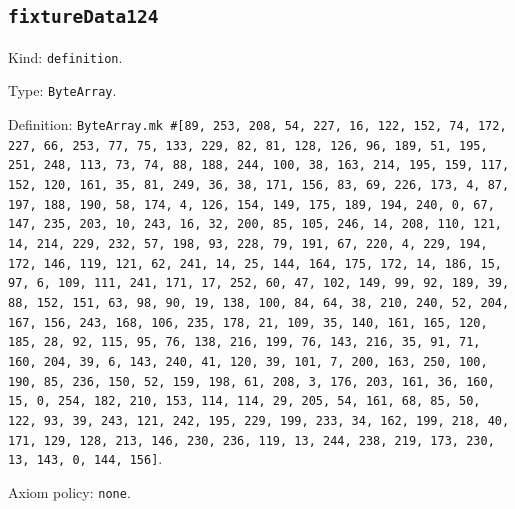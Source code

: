 \documentclass[11pt]{article}
\begin{document}
\subsection*{\texttt{fixtureData124}}
\noindent Kind: \texttt{definition}.\par
\noindent Type: \texttt{ByteArray}.\par
\noindent Definition: \texttt{ByteArray.mk \#[89, 253, 208, 54, 227, 16, 122, 152, 74, 172, 227, 66, 253, 77, 75, 133, 229, 82, 81, 128, 126, 96, 189, 51, 195, 251, 248, 113, 73, 74, 88, 188, 244, 100, 38, 163, 214, 195, 159, 117, 152, 120, 161, 35, 81, 249, 36, 38, 171, 156, 83, 69, 226, 173, 4, 87, 197, 188, 190, 58, 174, 4, 126, 154, 149, 175, 189, 194, 240, 0, 67, 147, 235, 203, 10, 243, 16, 32, 200, 85, 105, 246, 14, 208, 110, 121, 14, 214, 229, 232, 57, 198, 93, 228, 79, 191, 67, 220, 4, 229, 194, 172, 146, 119, 121, 62, 241, 14, 25, 144, 164, 175, 172, 14, 186, 15, 97, 6, 109, 111, 241, 171, 17, 252, 60, 47, 102, 149, 99, 92, 189, 39, 88, 152, 151, 63, 98, 90, 19, 138, 100, 84, 64, 38, 210, 240, 52, 204, 167, 156, 243, 168, 106, 235, 178, 21, 109, 35, 140, 161, 165, 120, 185, 28, 92, 115, 95, 76, 138, 216, 199, 76, 143, 216, 35, 91, 71, 160, 204, 39, 6, 143, 240, 41, 120, 39, 101, 7, 200, 163, 250, 100, 190, 85, 236, 150, 52, 159, 198, 61, 208, 3, 176, 203, 161, 36, 160, 15, 0, 254, 182, 210, 153, 114, 114, 29, 205, 54, 161, 68, 85, 50, 122, 93, 39, 243, 121, 242, 195, 229, 199, 233, 34, 162, 199, 218, 40, 171, 129, 128, 213, 146, 230, 236, 119, 13, 244, 238, 219, 173, 230, 13, 143, 0, 144, 156]}.\par
\noindent Axiom policy: \texttt{none}.\par
\end{document}
